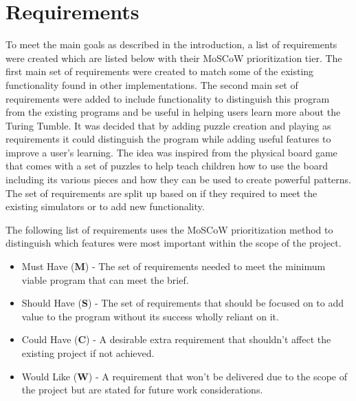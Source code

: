 \documentclass{l4proj}
\begin{document}
\section{Requirements}
To meet the main goals as described in the introduction, a list of requirements were created which are listed below with their MoSCoW \citep{noauthor_moscow_nodate} prioritization tier. The first main set of requirements were created to match some of the existing functionality found in other implementations. The second main set of requirements were added to include functionality to distinguish this program from the existing programs and be useful in helping users learn more about the Turing Tumble. It was decided that by adding puzzle creation and playing as requirements it could distinguish the program while adding useful features to improve a user's learning. The idea was inspired from the physical board game that comes with a set of puzzles to help teach children how to use the board including its various pieces and how they can be used to create powerful patterns. The set of requirements are split up based on if they required to meet the existing simulators or to add new functionality.

The following list of requirements uses the MoSCoW prioritization method to distinguish which features were most important within the scope of the project. 
\begin{itemize}
    \item Must Have (\textbf{M}) - The set of requirements needed to meet the minimum viable program that can meet the brief.
    \item Should Have (\textbf{S}) - The set of requirements that should be focused on to add value to the program without its success wholly reliant on it.
    \item Could Have (\textbf{C}) - A desirable extra requirement that shouldn't affect the existing project if not achieved.
    \item Would Like (\textbf{W}) - A requirement that won't be delivered due to the scope of the project but are stated for future work considerations.
\end{itemize}
\end{document}
